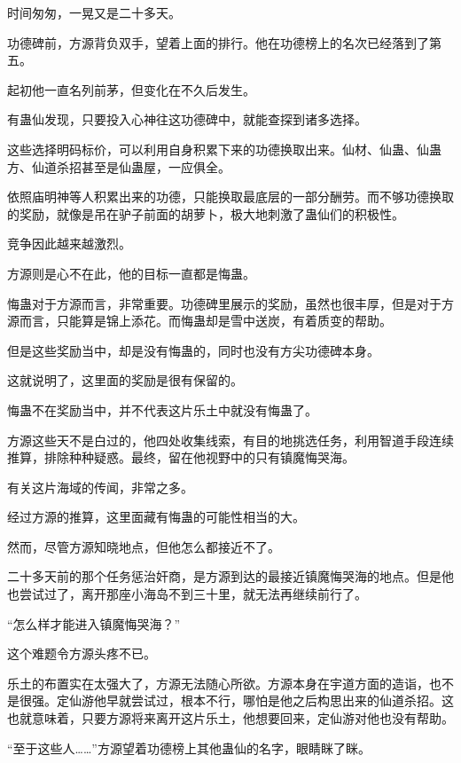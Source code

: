 
\begin{this_body}

时间匆匆，一晃又是二十多天。

功德碑前，方源背负双手，望着上面的排行。他在功德榜上的名次已经落到了第五。

起初他一直名列前茅，但变化在不久后发生。

有蛊仙发现，只要投入心神往这功德碑中，就能查探到诸多选择。

这些选择明码标价，可以利用自身积累下来的功德换取出来。仙材、仙蛊、仙蛊方、仙道杀招甚至是仙蛊屋，一应俱全。

依照庙明神等人积累出来的功德，只能换取最底层的一部分酬劳。而不够功德换取的奖励，就像是吊在驴子前面的胡萝卜，极大地刺激了蛊仙们的积极性。

竞争因此越来越激烈。

方源则是心不在此，他的目标一直都是悔蛊。

悔蛊对于方源而言，非常重要。功德碑里展示的奖励，虽然也很丰厚，但是对于方源而言，只能算是锦上添花。而悔蛊却是雪中送炭，有着质变的帮助。

但是这些奖励当中，却是没有悔蛊的，同时也没有方尖功德碑本身。

这就说明了，这里面的奖励是很有保留的。

悔蛊不在奖励当中，并不代表这片乐土中就没有悔蛊了。

方源这些天不是白过的，他四处收集线索，有目的地挑选任务，利用智道手段连续推算，排除种种疑惑。最终，留在他视野中的只有镇魔悔哭海。

有关这片海域的传闻，非常之多。

经过方源的推算，这里面藏有悔蛊的可能性相当的大。

然而，尽管方源知晓地点，但他怎么都接近不了。

二十多天前的那个任务惩治奸商，是方源到达的最接近镇魔悔哭海的地点。但是他也尝试过了，离开那座小海岛不到三十里，就无法再继续前行了。

“怎么样才能进入镇魔悔哭海？”

这个难题令方源头疼不已。

乐土的布置实在太强大了，方源无法随心所欲。方源本身在宇道方面的造诣，也不是很强。定仙游他早就尝试过，根本不行，哪怕是他之后构思出来的仙道杀招。这也就意味着，只要方源将来离开这片乐土，他想要回来，定仙游对他也没有帮助。

“至于这些人……”方源望着功德榜上其他蛊仙的名字，眼睛眯了眯。


\end{this_body}
